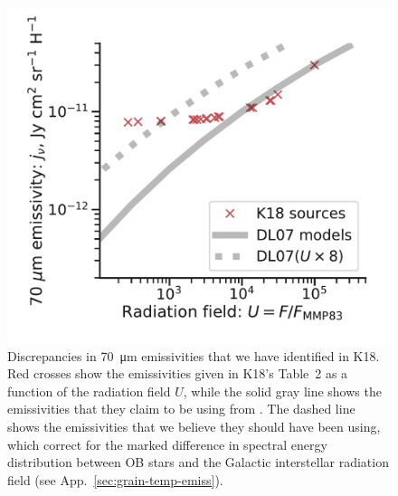 \begin{figure}
  \centering
  \includegraphics[width=\linewidth]{figs/K18-emissivity-vs-U}
  \caption{Discrepancies in \SI{70}{\um} emissivities that we have
    identified in K18.  Red crosses show the emissivities given in
    K18's Table~2 as a function of the radiation field \(U\), while
    the solid gray line shows the emissivities that they claim to be
    using from \citet{Draine:2007a}.  The dashed line shows the
    emissivities that we believe they should have been using, which
    correct for the marked difference in spectral energy distribution
    between OB stars and the Galactic interstellar radiation field
    (see App.~\ref{sec:grain-temp-emiss}).}
  \label{fig:k18-emissivity}
\end{figure}

